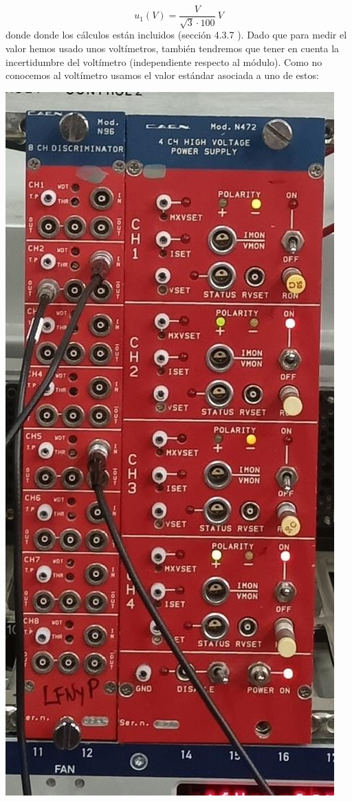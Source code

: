 \documentclass[11pt]{article}
\begin{document}
\begin{itemize}
\begin{minipage}{0.65\linewidth}
		\begin{equation}
			u_1(V) = \frac{V}{\sqrt{3} \cdot 100} \ \unit{V}
		\end{equation}donde
		donde los cálculos están incluidos (sección 4.3.7 \cite{GUM1995}). Dado que para medir el valor hemos usado unos voltímetros, también tendremos que tener en cuenta la incertidumbre del voltímetro (independiente respecto al módulo). Como no conocemos al voltímetro usamos el  valor estándar asociada a uno de estos:
	\end{minipage}
	\hfill
	\begin{minipage}{0.3\linewidth}
		\includegraphics[width=0.94\linewidth]{../Imagenes/Modulo_NIm_Caen.jpeg}
		\label{Fig:NIM}
	\end{minipage}


\end{itemize}
\end{document}
